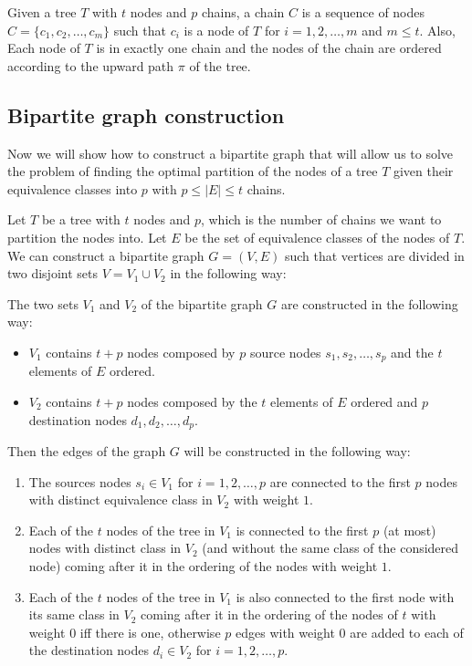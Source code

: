 \begin{definition}[Chains] \label{def:chains}
    Given a tree $T$ with $t$ nodes and $p$ chains, a chain $C$ is a sequence of nodes $C = \{c_1, c_2, \dots, c_m\}$ such that $c_i$ is a node of $T$ for $i = 1, 2, \dots, m$ and $m \leq t$. Also, Each node of $T$ is in exactly one chain and the nodes of the chain are ordered according to the upward path $\pi$ of the tree.
\end{definition}

\subsection{Bipartite graph construction}
Now we will show how to construct a bipartite graph that will allow us to solve the problem of finding the optimal partition of the nodes of a tree $T$ given their equivalence classes into $p$ with $p \leq |E| \leq t$ chains.

Let $T$ be a tree with $t$ nodes and $p$, which is the number of chains we want to partition the nodes into. Let $E$ be the set of equivalence classes of the nodes of $T$. We can construct a bipartite graph $G = (V, E)$ such that vertices are divided in two disjoint sets $V = V_1 \cup V_2$ in the following way:

\begin{definition} \label{def:bip_construction}
    The two sets $V_1$ and $V_2$ of the bipartite graph $G$ are constructed in the following way:
    \begin{itemize}
        \item $V_1$ contains $t + p$ nodes composed by $p$ source nodes $s_1, s_2, \dots, s_p$ and the $t$ elements of $E$ ordered.
        \item $V_2$ contains $t + p$ nodes composed by the $t$ elements of $E$ ordered and $p$ destination nodes $d_1, d_2, \dots, d_p$.
    \end{itemize}

    Then the edges of the graph $G$ will be constructed in the following way:
    \begin{enumerate}
        \item The sources nodes $s_i \in V_1$ for $i = 1, 2, \dots, p$ are connected to the first $p$ nodes with distinct equivalence class in $V_2$ with weight $1$.
        \item Each of the $t$ nodes of the tree in $V_1$ is connected to the first $p$ (at most) nodes with distinct class in $V_2$ (and without the same class of the considered node) coming after it in the ordering of the nodes  with weight $1$.
        \item Each of the $t$ nodes of the tree in $V_1$ is also connected to the first node with its same class in $V_2$ coming after it in the ordering of the nodes of $t$ with weight $0$ iff there is one, otherwise $p$ edges with weight $0$ are added to each of the destination nodes $d_i \in V_2$ for $i = 1, 2, \dots, p$.
    \end{enumerate}
\end{definition}

